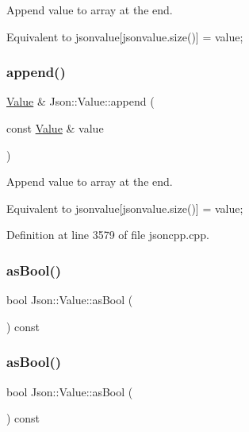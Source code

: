 Append value to array at the end. 

Equivalent to jsonvalue\mbox{[}jsonvalue.\+size()\mbox{]} = value; \hypertarget{class_json_1_1_value_a7e49ac977e4bcf59745a09d426669f75}{}\label{class_json_1_1_value_a7e49ac977e4bcf59745a09d426669f75} 
\subsubsection{\texorpdfstring{append()}{append()}\hspace{0.1cm}{\footnotesize\ttfamily [2/2]}}
{\footnotesize\ttfamily \hyperlink{class_json_1_1_value}{Value} \& Json\+::\+Value\+::append (\begin{DoxyParamCaption}\item[{const \hyperlink{class_json_1_1_value}{Value} \&}]{value }\end{DoxyParamCaption})}



Append value to array at the end. 

Equivalent to jsonvalue\mbox{[}jsonvalue.\+size()\mbox{]} = value; 

Definition at line 3579 of file jsoncpp.\+cpp.

\hypertarget{class_json_1_1_value_ab693fb7b9b1595bb0adc49658bbf780d}{}\label{class_json_1_1_value_ab693fb7b9b1595bb0adc49658bbf780d} 
\subsubsection{\texorpdfstring{as\+Bool()}{asBool()}\hspace{0.1cm}{\footnotesize\ttfamily [1/2]}}
{\footnotesize\ttfamily bool Json\+::\+Value\+::as\+Bool (\begin{DoxyParamCaption}{ }\end{DoxyParamCaption}) const}

\hypertarget{class_json_1_1_value_ab693fb7b9b1595bb0adc49658bbf780d}{}\label{class_json_1_1_value_ab693fb7b9b1595bb0adc49658bbf780d} 
\subsubsection{\texorpdfstring{as\+Bool()}{asBool()}\hspace{0.1cm}{\footnotesize\ttfamily [2/2]}}
{\footnotesize\ttfamily bool Json\+::\+Value\+::as\+Bool (\begin{DoxyParamCaption}{ }\end{DoxyParamCaption}) const}



